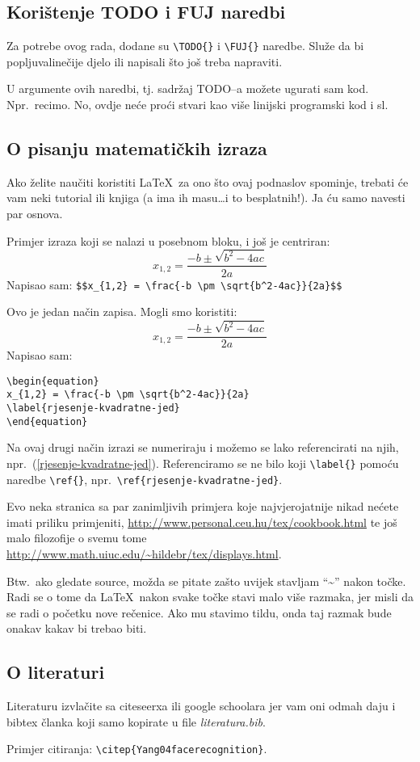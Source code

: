 \documentclass{article}
\begin{document}
\subsection{Korištenje TODO i FUJ naredbi}
Za potrebe ovog rada, dodane su \verb|\TODO{}| i \verb|\FUJ{}| naredbe. Služe
da bi popljuvalinečije djelo ili napisali što još treba
napraviti.

U argumente ovih naredbi, tj. sadržaj \textsf{TODO}--a možete ugurati sam kod.
Npr.~recimo. No, ovdje neće proći stvari kao više
linijski programski kod i sl.

\subsection{O pisanju matematičkih izraza}
Ako želite naučiti koristiti \LaTeX~za ono što ovaj podnaslov spominje, trebati
će vam neki tutorial ili knjiga (a ima ih masu\ldots i to besplatnih!).
Ja ću samo navesti par osnova.

Primjer izraza koji se nalazi u posebnom bloku, i još je centriran:
$$x_{1,2} = \frac{-b \pm \sqrt{b^2-4ac}}{2a}$$
Napisao sam: \verb|$$x_{1,2} = \frac{-b \pm \sqrt{b^2-4ac}}{2a}$$|

Ovo je jedan način zapisa. Mogli smo koristiti:
\begin{equation}
x_{1,2} = \frac{-b \pm \sqrt{b^2-4ac}}{2a}
\label{rjesenje-kvadratne-jed}
\end{equation}
Napisao sam:
\begin{verbatim}
\begin{equation}
x_{1,2} = \frac{-b \pm \sqrt{b^2-4ac}}{2a}
\label{rjesenje-kvadratne-jed}
\end{equation}
\end{verbatim}

Na ovaj drugi način izrazi se numeriraju i možemo se lako referencirati na
njih, npr.~(\ref{rjesenje-kvadratne-jed}). Referenciramo se ne bilo koji
\verb|\label{}| pomoću naredbe \verb|\ref{}|,
npr.~\verb|\ref{rjesenje-kvadratne-jed}|.

Evo neka stranica sa par zanimljivih primjera koje najvjerojatnije nikad nećete
imati priliku primjeniti, \url{http://www.personal.ceu.hu/tex/cookbook.html} te
još malo filozofije o svemu tome
\url{http://www.math.uiuc.edu/~hildebr/tex/displays.html}.

Btw.~ako gledate source, možda se pitate zašto uvijek stavljam ``\textasciitilde{}''
nakon točke. Radi se o tome da \LaTeX~nakon svake točke stavi malo više
razmaka, jer misli da se radi o početku nove rečenice. Ako mu stavimo tildu,
onda taj razmak bude onakav kakav bi trebao biti.

\subsection{O literaturi}
Literaturu izvlačite sa citeseerxa ili google schoolara jer vam oni odmah daju
i bibtex članka koji samo kopirate u file \emph{literatura.bib}.

Primjer citiranja: \verb|\citep{Yang04facerecognition}|.
\end{document}
